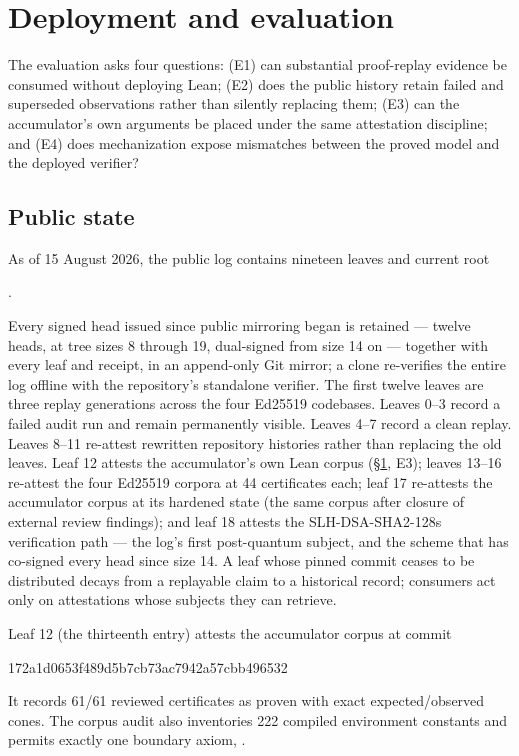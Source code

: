 \documentclass[11pt]{article}
\theoremstyle{remark}
\newcommand{\code}[1]{\texttt{\detokenize{#1}}}
\begin{document}
\section{Deployment and evaluation}\label{sec:deployment}

The evaluation asks four questions: (E1) can substantial proof-replay evidence
be consumed without deploying Lean; (E2) does the public history retain failed
and superseded observations rather than silently replacing them; (E3) can the
accumulator's own arguments be placed under the same attestation discipline;
and (E4) does mechanization expose mismatches between the proved model and the
deployed verifier?

\subsection{Public state}

As of 15 August 2026, the public log contains nineteen leaves and current root
\begin{center}
.
\end{center}
Every signed head issued since public mirroring began is retained --- twelve
heads, at tree sizes 8 through 19, dual-signed from size 14 on --- together
with every leaf and receipt, in an append-only Git mirror; a clone
re-verifies the entire log offline with the repository's standalone verifier.
The first twelve leaves are three replay generations across the four
Ed25519 codebases. Leaves 0--3
record a failed audit run and remain permanently visible. Leaves 4--7 record a
clean replay. Leaves 8--11 re-attest rewritten repository histories rather
than replacing the old leaves. Leaf 12 attests the accumulator's own Lean
corpus (\S\ref{sec:deployment}, E3); leaves 13--16 re-attest the four
Ed25519 corpora at 44 certificates each; leaf 17 re-attests the accumulator
corpus at its hardened state (the same corpus after closure of external
review findings); and leaf 18 attests the SLH-DSA-SHA2-128s
verification path --- the log's first post-quantum subject, and the scheme
that has co-signed every head since size 14. A leaf whose pinned commit ceases to be
distributed decays from a replayable claim to a historical record; consumers
act only on attestations whose subjects they can retrieve.

\begin{samepage}
Leaf 12 (the thirteenth entry) attests the accumulator corpus at commit
\begin{center}\small\ttfamily
172a1d0653f489d5b7cb73ac7942a57cbb496532
\end{center}
\end{samepage}
It records 61/61 reviewed
certificates as proven with exact expected/observed cones. The corpus audit
also inventories 222 compiled environment constants and permits exactly one
boundary axiom, \code{LTLAcc.sha256}.
\end{document}

